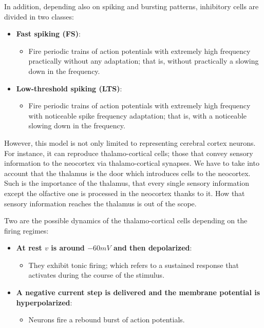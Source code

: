 \documentclass{article} %
\begin{document}
In addition, depending also on spiking and bursting patterns, inhibitory cells are divided in two classes:

\begin{itemize}
    \item \textbf{Fast spiking (FS)}:
    \begin{itemize}
        \item Fire periodic trains of action potentials with extremely high frequency practically without any adaptation; that is, without practically a slowing down in the frequency.
    \end{itemize}
     
    
    \item \textbf{Low-threshold spiking (LTS)}:
     \begin{itemize}
        \item Fire periodic trains of action potentials with extremely high frequency with noticeable spike frequency adaptation; that is, with a noticeable slowing down in the frequency.
    \end{itemize}
\end{itemize}

However, this model is not only limited to representing cerebral cortex neurons. For instance, it can reproduce thalamo-cortical cells; those that convey sensory information to the neocortex via thalamo-cortical synapses. We have to take into account that the thalamus is the door which introduces cells to the neocortex. Such is the importance of the thalamus, that every single sensory information except the olfactive one is processed in the neocortex thanks to it. How that sensory information reaches the thalamus is out of the scope.

Two are the possible dynamics of the thalamo-cortical cells depending on the firing regimes:

\begin{itemize}
    \item \textbf{At rest \(v\) is around \(-60mV\) and then depolarized}:
     \begin{itemize}
        \item They exhibit tonic firing; which refers to a sustained response that activates during the course of the stimulus.
    \end{itemize}
    
    \item \textbf{A negative current step is delivered and the membrane potential is hyperpolarized}:
     \begin{itemize}
        \item Neurons fire a rebound burst of action potentials.
    \end{itemize}
\end{itemize}
\end{document}

